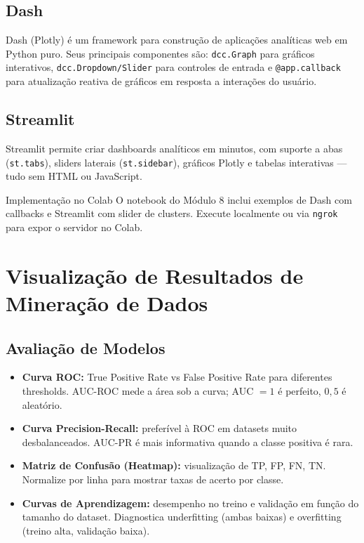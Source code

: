 \documentclass[12pt,a4paper]{article}
\begin{document}
\subsection{Dash}

Dash (Plotly) é um framework para construção de aplicações analíticas web em Python puro. Seus principais componentes são: \texttt{dcc.Graph} para gráficos interativos, \texttt{dcc.Dropdown/Slider} para controles de entrada e \texttt{@app.callback} para atualização reativa de gráficos em resposta a interações do usuário.

\subsection{Streamlit}

Streamlit permite criar dashboards analíticos em minutos, com suporte a abas (\texttt{st.tabs}), sliders laterais (\texttt{st.sidebar}), gráficos Plotly e tabelas interativas --- tudo sem HTML ou JavaScript.

\begin{dicabox}{Implementação no Colab}
O notebook do Módulo 8 inclui exemplos de Dash com callbacks e Streamlit com slider de clusters. Execute localmente ou via \texttt{ngrok} para expor o servidor no Colab.
\end{dicabox}

\section{Visualização de Resultados de Mineração de Dados}

\subsection{Avaliação de Modelos}

\begin{itemize}
  \item \textbf{Curva ROC:} True Positive Rate vs False Positive Rate para diferentes thresholds. AUC-ROC mede a área sob a curva; AUC $= 1$ é perfeito, $0{,}5$ é aleatório.
  \item \textbf{Curva Precision-Recall:} preferível à ROC em datasets muito desbalanceados. AUC-PR é mais informativa quando a classe positiva é rara.
  \item \textbf{Matriz de Confusão (Heatmap):} visualização de TP, FP, FN, TN. Normalize por linha para mostrar taxas de acerto por classe.
  \item \textbf{Curvas de Aprendizagem:} desempenho no treino e validação em função do tamanho do dataset. Diagnostica underfitting (ambas baixas) e overfitting (treino alta, validação baixa).
\end{itemize}
\end{document}
